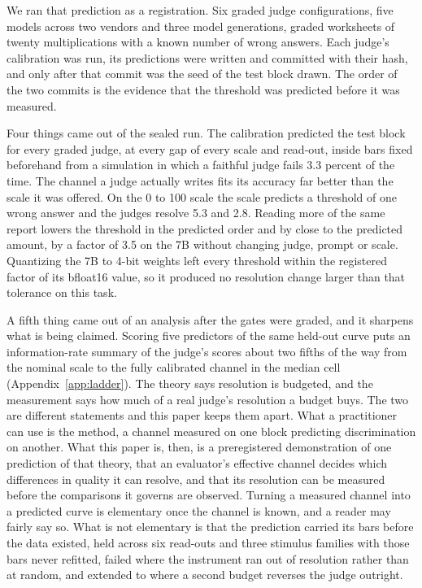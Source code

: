 \documentclass{article}
\theoremstyle{definition}
\theoremstyle{remark}
\begin{document}
We ran that prediction as a registration.
Six graded judge configurations, five models across two vendors and three model generations, graded worksheets of twenty multiplications with a known number of wrong answers.
Each judge's calibration was run, its predictions were written and committed with their hash, and only after that commit was the seed of the test block drawn.
The order of the two commits is the evidence that the threshold was predicted before it was measured.

Four things came out of the sealed run.
The calibration predicted the test block for every graded judge, at every gap of every scale and read-out, inside bars fixed beforehand from a simulation in which a faithful judge fails 3.3 percent of the time.
The channel a judge actually writes fits its accuracy far better than the scale it was offered. On the 0 to 100 scale the scale predicts a threshold of one wrong answer and the judges resolve 5.3 and 2.8.
Reading more of the same report lowers the threshold in the predicted order and by close to the predicted amount, by a factor of 3.5 on the 7B without changing judge, prompt or scale.
Quantizing the 7B to 4-bit weights left every threshold within the registered factor of its bfloat16 value, so it produced no resolution change larger than that tolerance on this task.

A fifth thing came out of an analysis after the gates were graded, and it sharpens what is being claimed.
Scoring five predictors of the same held-out curve puts an information-rate summary of the judge's scores about two fifths of the way from the nominal scale to the fully calibrated channel in the median cell (Appendix~\ref{app:ladder}).
The theory says resolution is budgeted, and the measurement says how much of a real judge's resolution a budget buys. The two are different statements and this paper keeps them apart.
What a practitioner can use is the method, a channel measured on one block predicting discrimination on another.
What this paper is, then, is a preregistered demonstration of one prediction of that theory, that an evaluator's effective channel decides which differences in quality it can resolve, and that its resolution can be measured before the comparisons it governs are observed.
Turning a measured channel into a predicted curve is elementary once the channel is known, and a reader may fairly say so. What is not elementary is that the prediction carried its bars before the data existed, held across six read-outs and three stimulus families with those bars never refitted, failed where the instrument ran out of resolution rather than at random, and extended to where a second budget reverses the judge outright.
\end{document}
